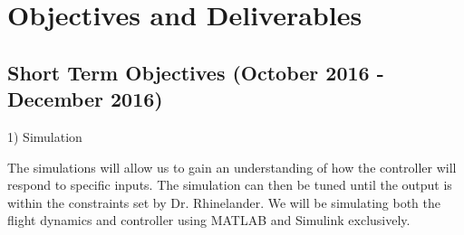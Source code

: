 \section{Objectives and Deliverables}
\subsection{Short Term Objectives (October 2016 - December 2016)}
1) Simulation

	The simulations will allow us to gain an understanding of how the controller will respond to specific inputs. The simulation can then be tuned until the output is within the constraints set by Dr. Rhinelander. We will be simulating both the flight dynamics and controller using MATLAB and Simulink exclusively. 
	
